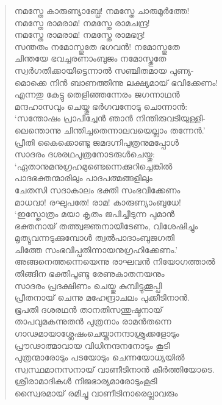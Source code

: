\begin{verse}
നമസ്തേ കാരുണ്യാബ്ധേ! നമസ്തേ ചാരുമൂര്‍ത്തേ!\\
നമസ്തേ രാമരാമ! നമസ്തേ രാമചന്ദ്ര!\\
നമസ്തേ രാമരാമ! നമസ്തേ രാമഭദ്ര!\\
സന്തതം നമോസ്തുതേ ഭഗവന്‍! നമോസ്തുതേ\\
ചിന്തയേ ഭവച്ചരണാംബുജം നമോസ്തുതേ\\
സ്വര്‍ഗതിക്കായിട്ടെന്നാല്‍ സഞ്ചിതമായ പുണ്യ-\\
മൊക്കെ നിന്‍ ബാണത്തിന്നു ലക്ഷ്യമായ് ഭവിക്കേണം!\\
എന്നതു കേട്ടു തെളിഞ്ഞന്നേരം ജഗന്നാഥന്‍\\
മന്ദഹാസവും ചെയ്തു ഭര്‍ഗവനോടു ചൊന്നാന്‍:\\
‘സന്തോഷം പ്രാപിച്ചേന്‍ ഞാന്‍ നിന്തിരുവടിയുള്ളി-\\
ലെന്തൊന്നു ചിന്തിച്ചതെന്നാലവയെല്ലാം തന്നേന്‍.’\\
പ്രീതി കൈക്കൊണ്ടു ജമദഗ്നിപുത്രനുമപ്പോള്‍\\
സാദരം ദശരഥപുത്രനോടരുള്‍ചെയ്തു:\\
‘ഏതാനുമനുഗ്രഹമുണ്ടെന്നെക്കുറിച്ചെങ്കില്‍\\
പാദഭക്തന്മാരിലും പാദപത്മങ്ങളിലും\\
ചേതസി സദാകാലം ഭക്തി സംഭവിക്കേണം\\
മാധവാ! രഘുപതേ! രാമ! കാരുണ്യാംബുധേ!\\
‘ഇസ്തോത്രം മയാ കൃതം ജപിച്ചീടുന്ന പുമാന്‍\\
ഭക്തനായ് തത്ത്വജ്ഞനായീടേണം, വിശേഷിച്ചും\\
മൃത്യുവന്നടുക്കുമ്പോള്‍ ത്വല്‍പാദാംബുജഗതി\\
ചിത്തേ സംഭവിപ്പതിന്നായനുഗ്രഹിക്കേണം.’\\
അങ്ങനെത്തന്നെയെന്നു രാഘവന്‍ നിയോഗത്താല്‍\\
തിങ്ങിന ഭക്തിപൂണ്ടു രേണുകാതനയനും\\
സാദരം പ്രദക്ഷിണം ചെയ്തു കുമ്പിട്ടുക്കൂപ്പി\\
പ്രീതനായ് ചെന്നു മഹേന്ദ്രാചലം പുക്കീടിനാന്‍.\\
ഭൂപതി ദശരഥന്‍ താനതിസന്തുഷ്ടനായ്\\
താപവുമകന്നുതന്‍ പുത്രനാം രാമന്‍തന്നെ\\
ഗാഢമായാശ്ലേഷംചെയ്താനന്ദാശ്രുക്കളോടും\\
പ്രൗഢാത്മാവായ വിധിനന്ദനനോടും കൂടി\\
പുത്രന്മാരോടും പടയോടും ചെന്നയോധ്യയില്‍\\
സ്വസ്ഥമാനസനായ് വാണീടിനാന്‍ കീര്‍ത്തിയോടെ.\\
ശ്രീരാമാദികള്‍ നിജഭാര്യമാരോടുംകൂടി\\
സ്വൈരമായ് രമിച്ചു വാണീടിനാരെല്ലാവരും\\

\end{verse}
